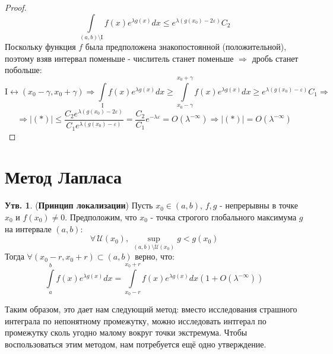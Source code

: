 \documentclass[12pt]{article}
\newcommand{\MI}{\mathrm{I}}
\newcommand{\MU}{\mathcal{U}}
\newcommand{\VE}{\varepsilon}
\theoremstyle{definition}
\newtheorem{prop}{Утв.}
\newcommand{\ddint}[2]{\displaystyle\int\limits_{#1}^{#2}}
\begin{document}
\begin{proof}
	$$
		\displaystyle \int\limits_{(a,b)\setminus \MI}f(x)e^{\lambda g(x)}dx \leq e^{\lambda (g(x_0) - 2\VE)}C_2
	$$
	Поскольку функция $f$ была предположена знакопостоянной (положительной), поэтому взяв интервал поменьше - числитель станет поменьше $\Rightarrow$ дробь станет побольше:
	$$
		\MI \leftrightarrow (x_0 - \gamma, x_0 + \gamma) \Rightarrow \displaystyle \int\limits_{\MI} f(x)e^{\lambda g(x)}dx \geq \ddint{x_0 - \gamma}{x_0 + \gamma}f(x)e^{\lambda g(x)}dx \geq e^{\lambda (g(x_0) - \VE)}C_1 \Rightarrow 
	$$	
	$$
		\Rightarrow |(*)| \leq \dfrac{C_2 e^{\lambda (g(x_0) - 2\VE)}}{C_1 e^{\lambda (g(x_0) - \VE)}} = \dfrac{C_2}{C_1}e^{-\lambda \VE} = O(\lambda^{-\infty}) \Rightarrow |(*)|  = O(\lambda^{-\infty})
	$$
\end{proof}

\newpage
\section*{Метод Лапласа}

\begin{prop}(\textbf{Принцип локализации})
	Пусть $x_0 \in (a,b)$, $f,g$ - непрерывны в точке $x_0$ и $f(x_0) \neq 0$. Предположим, что $x_0$ - точка строгого глобального максимума $g$ на интервале $(a,b)$:
	$$
		\forall \, \MU(x_0), \, \sup\limits_{(a,b) \setminus \MU(x_0)} g < g(x_0)
	$$
	Тогда $\forall (x_0 - r, x_0 + r) \subset (a,b)$ верно, что:
	$$
		\ddint{a}{b}f(x)e^{\lambda g(x)}dx = \ddint{x_0 - r}{x_0 + r}f(x)e^{\lambda g(x)}dx \left(1 + O(\lambda^{-\infty})\right)
	$$
\end{prop}
Таким образом, это дает нам следующий метод: вместо исследования страшного интеграла по непонятному промежутку, можно исследовать интгерал по промежутку сколь угодно малому вокруг точки экстремума. Чтобы воспользоваться этим методом, нам потребуется ещё одно утверждение.
\end{document}
